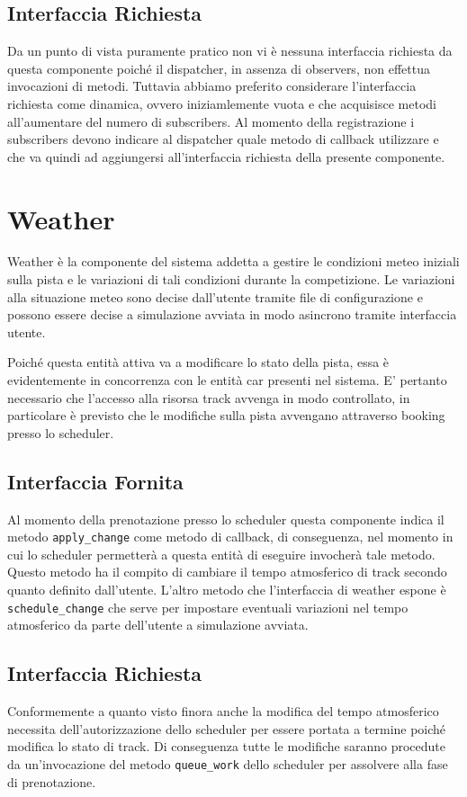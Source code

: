 \documentclass[11pt,a4paper]{report}
\newcommand{\fun}[1]{\texttt{#1}}
\begin{document}
\subsection*{Interfaccia Richiesta}
Da un punto di vista puramente pratico non vi è nessuna interfaccia richiesta da questa componente poiché il dispatcher, in assenza di observers, non effettua invocazioni di metodi. Tuttavia abbiamo preferito considerare l'interfaccia richiesta come dinamica, ovvero iniziamlemente vuota e che acquisisce metodi all'aumentare del numero di subscribers. Al momento della registrazione i subscribers devono indicare al dispatcher quale metodo di callback utilizzare e che va quindi ad aggiungersi all'interfaccia richiesta della presente componente.
\section{Weather}
Weather è la componente del sistema addetta a gestire le condizioni meteo iniziali sulla pista e le variazioni di tali condizioni durante la competizione. Le variazioni alla situazione meteo sono decise dall'utente tramite file di configurazione e possono essere decise a simulazione avviata in modo asincrono tramite interfaccia utente.

Poiché questa entità attiva va a modificare lo stato della pista, essa è evidentemente in concorrenza con le entità car presenti nel sistema. E' pertanto necessario che l'accesso alla risorsa track avvenga in modo controllato, in particolare è previsto che le modifiche sulla pista avvengano attraverso booking presso lo scheduler.
\subsection*{Interfaccia Fornita}
Al momento della prenotazione presso lo scheduler questa componente indica il metodo \fun{apply\_change} come metodo di callback, di conseguenza, nel momento in cui lo scheduler permetterà a questa entità di eseguire invocherà tale metodo. Questo metodo ha il compito di cambiare il tempo atmosferico di track secondo quanto definito dall'utente.
L'altro metodo che l'interfaccia di weather espone è \fun{schedule\_change} che serve per impostare eventuali variazioni nel tempo atmosferico da parte dell'utente a simulazione avviata.
\subsection*{Interfaccia Richiesta}
Conformemente a quanto visto finora anche la modifica del tempo atmosferico necessita dell'autorizzazione dello scheduler per essere portata a termine poiché modifica lo stato di track. Di conseguenza tutte le modifiche saranno procedute da un'invocazione del metodo \fun{queue\_work} dello scheduler per assolvere alla fase di prenotazione.
\end{document}
